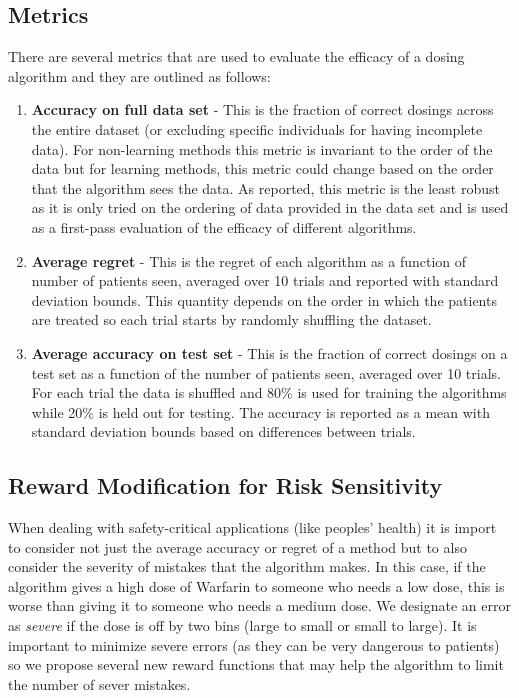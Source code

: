 \documentclass{article}
\begin{document}
\subsection{Metrics}
There are several metrics that are used to evaluate the efficacy of a dosing algorithm and they are outlined as follows:
\begin{enumerate}
    \item \textbf{Accuracy on full data set} - This is the fraction of correct dosings across the entire dataset (or excluding specific individuals for having incomplete data). For non-learning methods this metric is invariant to the order of the data but for learning methods, this metric could change based on the order that the algorithm sees the data. As reported, this metric is the least robust as it is only tried on the ordering of data provided in the data set and is used as a first-pass evaluation of the efficacy of different algorithms.
    \item \textbf{Average regret} - This is the regret of each algorithm as a function of number of patients seen, averaged over 10 trials and reported with standard deviation bounds. This quantity depends on the order in which the patients are treated so each trial starts by randomly shuffling the dataset.
    \item \textbf{Average accuracy on test set} - This is the fraction of correct dosings on a test set as a function of the number of patients seen, averaged over 10 trials. For each trial the data is shuffled and 80\% is used for training the algorithms while 20\% is held out for testing. The accuracy is reported as a mean with standard deviation bounds based on differences between trials. 
\end{enumerate}


\subsection{Reward Modification for Risk Sensitivity}
When dealing with safety-critical applications (like peoples' health) it is import to consider not just the average accuracy or regret of a method but to also consider the severity of mistakes that the algorithm makes. In this case, if the algorithm gives a high dose of Warfarin to someone who needs a low dose, this is worse than giving it to someone who needs a medium dose. We designate an error as \textit{severe} if the dose is off by two bins (large to small or small to large). It is important to minimize severe errors (as they can be very dangerous to patients) so we propose several new reward functions that may help the algorithm to limit the number of sever mistakes. 
\end{document}
